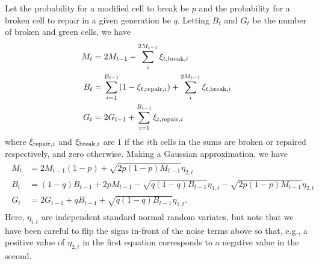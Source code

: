 \documentclass{article}
\begin{document}
Let the probability for a modified cell to break be $p$ and the probability for a broken cell to repair in a given generation be $q$. Letting $B_t$ and $G_t$ be the number of broken and green cells, we have
\begin{align}
M_t &= 2M_{t-1} -  \sum_{i}^{2M_{t-1}}\xi_{t,{\rm break},i}\\
B_t &= \sum_{i=1}^{B_{t-1}}(1-\xi_{t,{\rm repair},i}) + \sum_{i}^{2M_{t-1}}\xi_{t,{\rm break},i}\\
G_t &=2G_{t-1} + \sum_{i=1}^{B_{t-1}}\xi_{t,{\rm repair},i} 
\end{align}
where $\xi_{{\rm repair},i}$ and $\xi_{{\rm break},i}$ are $1$ if the $i$th cells in the sums are broken or repaired respectively, and zero otherwise. Making a Gaussian approximation, we have 
\begin{align}
\begin{split}\label{MBGt}
M_t &= 2M_{t-1}(1 - p)+ \sqrt{2p(1-p)M_{t-1}} \eta_{2,t}\\
B_t &= (1-q)B_{t-1} +2pM_{t-1} - \sqrt{q(1-q)B_{t-1}}\eta_{1,t} - \sqrt{2p(1-p)M_{t-1}} \eta_{2,t}\\
G_t &=2G_{t-1} + qB_{t-1}+\sqrt{q(1-q)B_{t-1}}\eta_{1,t}.
\end{split}
\end{align}
Here, $\eta_{i,t}$ are independent standard normal random variates, but note that we have been careful to flip the signs in-front of the noise terms above so that, e.g., a positive value of $\eta_{2,t}$ in the first equation corresponds to a negative value in the second. 
\end{document}
